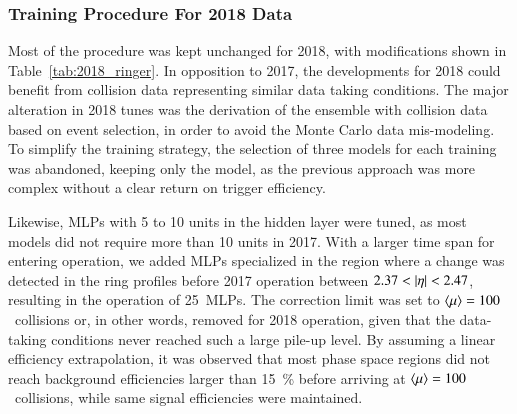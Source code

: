 



\FloatBarrier
\subsubsection{Training Procedure For 2018 Data}\label{ssec:2018}

Most of the procedure was kept unchanged for 2018, with modifications shown in
Table~\ref{tab:2018_ringer}.
In opposition to 2017, the developments for 2018
could benefit from collision data 
representing similar data taking conditions.
The major alteration in 2018 tunes was the derivation of the \rnn{} ensemble with collision data based on \Zee{} \tnp{} event selection, in order to avoid the Monte Carlo data mis-modeling.
To simplify the training strategy, the selection of three models for each training was abandoned, keeping only the \spmax{} model, as the previous approach was more complex without a clear return on trigger efficiency. 

Likewise, MLPs with 5 to 10 units in the hidden layer were tuned, as most models did not require
more than 10 units in 2017. With a larger time span for entering operation, we
added MLPs specialized in the region where a change was detected in the ring
profiles before 2017 operation between $2.37<\abseta<2.47$, resulting in the operation of
\SI{25}{MLPs}. The correction limit was set to
$\langle \mu \rangle{}=100$~collisions or, in other words, removed for 2018 operation, given
that the data-taking 
conditions never reached such a large pile-up level. By
assuming a linear efficiency extrapolation, 
it was observed that most phase space regions did not reach background efficiencies
larger than \SI{15}{\%} before arriving at $\langle \mu \rangle=100$~collisions, while same
signal efficiencies were maintained.






